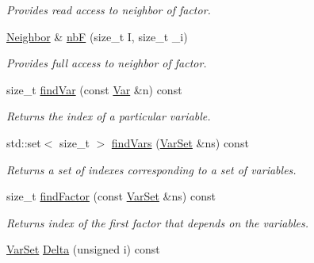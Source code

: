 \begin{CompactItemize}
\begin{CompactList}\small\item\em Provides read access to neighbor of factor. \item\end{CompactList}\item 
\hypertarget{classdai_1_1FactorGraph_bb04181cfad3d5e461bff89c6fa0f83a}{
\hyperlink{structdai_1_1BipartiteGraph_1_1Neighbor}{Neighbor} \& \hyperlink{classdai_1_1FactorGraph_bb04181cfad3d5e461bff89c6fa0f83a}{nbF} (size\_\-t I, size\_\-t \_\-i)}
\label{classdai_1_1FactorGraph_bb04181cfad3d5e461bff89c6fa0f83a}

\begin{CompactList}\small\item\em Provides full access to neighbor of factor. \item\end{CompactList}\item 
\hypertarget{classdai_1_1FactorGraph_25f3ffef7d09bbea7fe4ec69840395b3}{
size\_\-t \hyperlink{classdai_1_1FactorGraph_25f3ffef7d09bbea7fe4ec69840395b3}{findVar} (const \hyperlink{classdai_1_1Var}{Var} \&n) const }
\label{classdai_1_1FactorGraph_25f3ffef7d09bbea7fe4ec69840395b3}

\begin{CompactList}\small\item\em Returns the index of a particular variable. \item\end{CompactList}\item 
\hypertarget{classdai_1_1FactorGraph_ae887d817c2e6e081d91e54083abc6ad}{
std::set$<$ size\_\-t $>$ \hyperlink{classdai_1_1FactorGraph_ae887d817c2e6e081d91e54083abc6ad}{findVars} (\hyperlink{classdai_1_1VarSet}{VarSet} \&ns) const }
\label{classdai_1_1FactorGraph_ae887d817c2e6e081d91e54083abc6ad}

\begin{CompactList}\small\item\em Returns a set of indexes corresponding to a set of variables. \item\end{CompactList}\item 
\hypertarget{classdai_1_1FactorGraph_c7a2074bd52b7cb35a6473208140bb34}{
size\_\-t \hyperlink{classdai_1_1FactorGraph_c7a2074bd52b7cb35a6473208140bb34}{findFactor} (const \hyperlink{classdai_1_1VarSet}{VarSet} \&ns) const }
\label{classdai_1_1FactorGraph_c7a2074bd52b7cb35a6473208140bb34}

\begin{CompactList}\small\item\em Returns index of the first factor that depends on the variables. \item\end{CompactList}\item 
\hypertarget{classdai_1_1FactorGraph_b0c02cc79dbbe2d23f67281b7af76ed1}{
\hyperlink{classdai_1_1VarSet}{VarSet} \hyperlink{classdai_1_1FactorGraph_b0c02cc79dbbe2d23f67281b7af76ed1}{Delta} (unsigned i) const }
\label{classdai_1_1FactorGraph_b0c02cc79dbbe2d23f67281b7af76ed1}


\end{CompactItemize}
